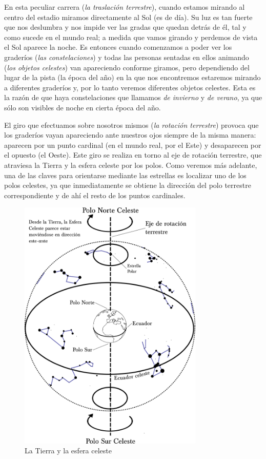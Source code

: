 \documentclass[11pt,a5paper,twoside]{amsbook}
\begin{document}
En esta peculiar carrera (\textit{la traslación terrestre}), cuando estamos mirando al centro del estadio miramos directamente al Sol (es de día). Su luz es tan fuerte que nos deslumbra y nos impide ver las gradas que quedan detrás de él, tal y como sucede en el mundo real; a medida que vamos girando y perdemos de vista el Sol aparece la noche. Es entonces cuando comenzamos a poder ver los graderíos (\textit{las constelaciones}) y todas las personas sentadas en ellos animando (\textit{los objetos celestes}) van apareciendo conforme giramos, pero dependiendo del lugar de la pista (la época del año) en la que nos encontremos estaremos mirando a diferentes graderíos y, por lo tanto veremos diferentes objetos celestes. Esta es la razón de que haya constelaciones que llamamos \textit{de invierno} y \textit{de verano}, ya que sólo son visibles de noche en cierta época del año.

El giro que efectuamos sobre nosotros mismos (\textit{la rotación terrestre}) provoca que los graderíos vayan apareciendo ante nuestros ojos siempre de la misma manera: aparecen por un punto cardinal (en el mundo real, por el Este) y desaparecen por el opuesto (el Oeste). Este giro se realiza en torno al eje de rotación terrestre, que atraviesa la Tierra y la esfera celeste por los polos. Como veremos más adelante, una de las claves para orientarse mediante las estrellas es localizar uno de los polos celestes, ya que inmediatamente se obtiene la dirección del polo terrestre correspondiente y de ahí el resto de los puntos cardinales.

\vspace*{0.4in}

\begin{figure}[ht]
 \centering
 \includegraphics[width=250pt,keepaspectratio=true]{./esquema_cielo.png}
 \caption{La Tierra y la esfera celeste}
 \label{tierra_esfera}
\end{figure}
\end{document}
